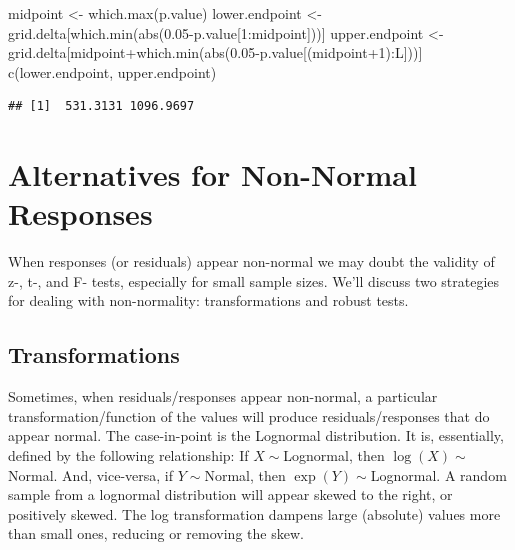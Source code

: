 \documentclass[
]{book}
\newenvironment{Shaded}{\begin{snugshade}}{\end{snugshade}}
\newcommand{\DecValTok}[1]{\textcolor[rgb]{0.00,0.00,0.81}{#1}}
\newcommand{\FloatTok}[1]{\textcolor[rgb]{0.00,0.00,0.81}{#1}}
\newcommand{\FunctionTok}[1]{\textcolor[rgb]{0.00,0.00,0.00}{#1}}
\newcommand{\NormalTok}[1]{#1}
\newcommand{\OtherTok}[1]{\textcolor[rgb]{0.56,0.35,0.01}{#1}}
\newcommand{\SpecialCharTok}[1]{\textcolor[rgb]{0.00,0.00,0.00}{#1}}
\begin{document}
\begin{Shaded}
\begin{Highlighting}[]
\NormalTok{midpoint }\OtherTok{\textless{}{-}} \FunctionTok{which.max}\NormalTok{(p.value)}
\NormalTok{lower.endpoint }\OtherTok{\textless{}{-}}\NormalTok{ grid.delta[}\FunctionTok{which.min}\NormalTok{(}\FunctionTok{abs}\NormalTok{(}\FloatTok{0.05}\SpecialCharTok{{-}}\NormalTok{p.value[}\DecValTok{1}\SpecialCharTok{:}\NormalTok{midpoint]))]}
\NormalTok{upper.endpoint }\OtherTok{\textless{}{-}}\NormalTok{ grid.delta[midpoint}\SpecialCharTok{+}\FunctionTok{which.min}\NormalTok{(}\FunctionTok{abs}\NormalTok{(}\FloatTok{0.05}\SpecialCharTok{{-}}\NormalTok{p.value[(midpoint}\SpecialCharTok{+}\DecValTok{1}\NormalTok{)}\SpecialCharTok{:}\NormalTok{L]))]}
\FunctionTok{c}\NormalTok{(lower.endpoint, upper.endpoint)}
\end{Highlighting}
\end{Shaded}

\begin{verbatim}
## [1]  531.3131 1096.9697
\end{verbatim}

\hypertarget{alternatives-for-non-normal-responses}{%
\chapter{Alternatives for Non-Normal Responses}\label{alternatives-for-non-normal-responses}}

When responses (or residuals) appear non-normal we may doubt the validity of z-, t-, and F- tests, especially for small sample sizes. We'll discuss two strategies for dealing with non-normality: transformations and robust tests.

\hypertarget{transformations}{%
\section{Transformations}\label{transformations}}

Sometimes, when residuals/responses appear non-normal, a particular transformation/function of the values will produce residuals/responses that do appear normal. The case-in-point is the Lognormal distribution. It is, essentially, defined by the following relationship: If \(X\sim\)Lognormal, then \(\log(X)\sim\)Normal. And, vice-versa, if \(Y\sim\)Normal, then \(\exp(Y)\sim\)Lognormal. A random sample from a lognormal distribution will appear skewed to the right, or positively skewed. The log transformation dampens large (absolute) values more than small ones, reducing or removing the skew.
\end{document}
